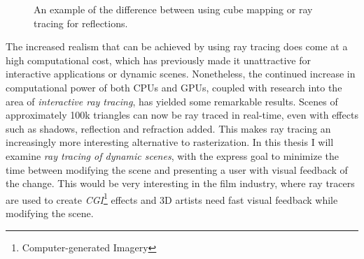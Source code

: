 
\begin{figure}
  \centering
  \hspace{10pt}
  \caption[Reflections created with cube mapping and ray tracing.]{An example of
    the difference between using cube mapping or ray tracing for
    reflections.}
  \label{fig:reflectingDragons}
\end{figure}



The increased realism that can be achieved by using ray tracing does come at a
high computational cost, which has previously made it unattractive for
interactive applications or dynamic scenes. Nonetheless, the continued increase
in computational power of both CPUs and GPUs, coupled with research into the
area of \textit{interactive ray tracing}, has yielded some remarkable results.
Scenes of approximately 100k triangles can now be ray traced in real-time, even
with effects such as shadows, reflection and refraction added. This makes ray
tracing an increasingly more interesting alternative to rasterization. In this
thesis I will examine \textit{ray tracing of dynamic scenes}, with the express
goal to minimize the time between modifying the scene and presenting a user with
visual feedback of the change. This would be very interesting in the film
industry, where ray tracers are used to create
\textit{CGI}\footnote{Computer-generated Imagery} effects and 3D artists need
fast visual feedback while modifying the scene.


